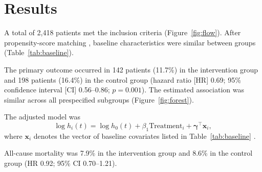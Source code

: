 \section{Results}
\label{sec:results}

A total of 2,418 patients met the inclusion criteria (Figure~\ref{fig:flow}). After propensity-score matching \cite{austin2011introduction}, baseline characteristics were similar between groups (Table~\ref{tab:baseline}).

The primary outcome occurred in 142 patients (11.7\%) in the intervention group and 198 patients (16.4\%) in the control group (hazard ratio [HR] 0.69; 95\% confidence interval [CI] 0.56--0.86; $p = 0.001$). The estimated association was similar across all prespecified subgroups (Figure~\ref{fig:forest}).

The adjusted model was
\begin{equation}
  \log h_i(t) = \log h_0(t) + \beta_1 \text{Treatment}_i + \boldsymbol{\gamma}^\top \mathbf{x}_i ,
  \label{eq:cox}
\end{equation}
where $\mathbf{x}_i$ denotes the vector of baseline covariates listed in Table~\ref{tab:baseline} \cite{cox1972regression, therneau2000modeling}.

All-cause mortality was 7.9\% in the intervention group and 8.6\% in the control group (HR 0.92; 95\% CI 0.70--1.21).
